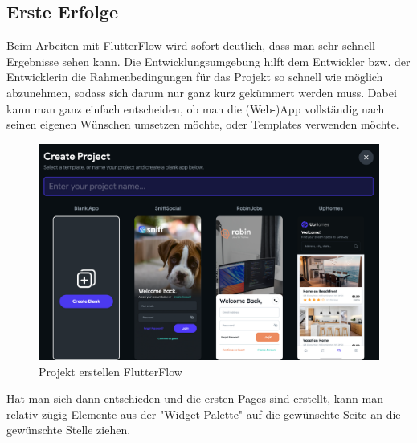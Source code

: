 \documentclass[acmtog, language=ngerman]{acmart}
\begin{document}
\subsection{Erste Erfolge}
Beim Arbeiten mit FlutterFlow wird sofort deutlich, dass man sehr schnell Ergebnisse sehen kann. Die Entwicklungsumgebung hilft dem Entwickler bzw. der Entwicklerin die Rahmenbedingungen für das Projekt so schnell wie möglich abzunehmen, sodass sich darum nur ganz kurz gekümmert werden muss.
Dabei kann man ganz einfach entscheiden, ob man die (Web-)App vollständig nach seinen eigenen Wünschen umsetzen möchte, oder Templates verwenden möchte.
\begin{figure}[h]
    \centering
    \includegraphics[width=1\linewidth]{images/FF_projekt_erstellen.png}
    \caption{Projekt erstellen FlutterFlow}
    \label{fig:enter-label}
\end{figure}
Hat man sich dann entschieden und die ersten Pages sind erstellt, kann man relativ zügig Elemente aus der "Widget Palette" auf die gewünschte Seite an die gewünschte Stelle ziehen.
\end{document}
